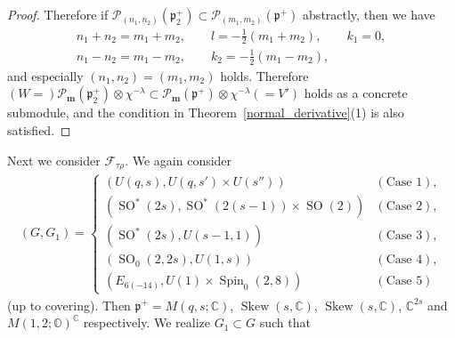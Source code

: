 \documentclass[pdftex]{sigma}
\numberwithin{equation}{section}
\newcommand{\bm}{\mathbf{m}}
\newcommand{\BC}{\mathbb{C}}
\newcommand{\BO}{\mathbb{O}}
\newcommand{\fp}{\mathfrak{p}}
\newcommand{\cF}{\mathcal{F}}
\newcommand{\cP}{\mathcal{P}}
\newcommand{\Skew}{\operatorname{Skew}}
\begin{document}
\begin{proof}
Therefore if $\cP_{(n_1,n_2)}(\fp^+_2)\subset\cP_{(m_1,m_2)}(\fp^+)$ abstractly, then we have
\begin{gather*} n_1+n_2=m_1+m_2,\qquad l=-\tfrac12 (m_1+m_2),\qquad k_1=0,\\ n_1-n_2=m_1-m_2,\qquad k_2=-\tfrac12 (m_1-m_2),
\end{gather*}
and especially $(n_1,n_2)=(m_1,m_2)$ holds. Therefore
$(W=)\cP_\bm(\fp^+_2)\otimes\chi^{-\lambda}\subset\cP_\bm(\fp^+)\otimes\chi^{-\lambda}(=V')$ holds as a concrete submodule,
and the condition in Theorem~\ref{normal_derivative}(1) is also satisfied.
\end{proof}

Next we consider $\cF_{\tau\rho}$. We again consider
\begin{gather*} (G,G_1)=\begin{cases} (U(q,s),U(q,s')\times U(s''))&(\text{Case }1),\\
(\operatorname{SO}^*(2s),\operatorname{SO}^*(2(s-1))\times \operatorname{SO}(2))&(\text{Case }2),\\
(\operatorname{SO}^*(2s),U(s-1,1))&(\text{Case }3),\\
(\operatorname{SO}_0(2,2s),U(1,s))&(\text{Case }4),\\
(E_{6(-14)},U(1)\times \operatorname{Spin}_0(2,8))&(\text{Case }5) \end{cases} \end{gather*}
(up to covering). Then $\fp^+=M(q,s;\BC)$, $\Skew(s,\BC)$, $\Skew(s,\BC)$, $\BC^{2s}$ and $M(1,2;\BO)^\BC$ respectively.
We realize $G_1\subset G$ such that
\end{document}

